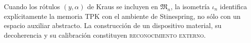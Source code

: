 Cuando los rótulos \((y,\alpha)\) de Kraus se incluyen en
\(\mathfrak M_n\), la isometría \(\iota_n\) identifica explícitamente la
memoria TPK con el ambiente de Stinespring, no sólo con un espacio auxiliar
abstracto. La construcción de un dispositivo material, su decoherencia y
su calibración constituyen \textsc{reconocimiento externo}.


